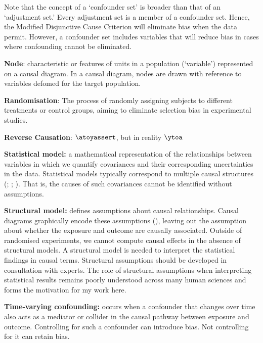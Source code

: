 \documentclass[
  singlecolumn]{article}
\begin{document}
Note that the concept of a `confounder set' is broader than that of an
`adjustment set.' Every adjustment set is a member of a confounder set.
Hence, the Modified Disjunctive Cause Criterion will eliminate bias when
the data permit. However, a confounder set includes variables that will
reduce bias in cases where confounding cannot be eliminated.

\textbf{Node}: characteristic or features of units in a population
(`variable') represented on a causal diagram. In a causal diagram, nodes
are drawn with reference to variables defomed for the target population.

\textbf{Randomisation}: The process of randomly assigning subjects to
different treatments or control groups, aiming to eliminate selection
bias in experimental studies.

\textbf{Reverse Causation}: \(\atoyassert\), but in reality \(\ytoa\)

\textbf{Statistical model:} a mathematical representation of the
relationships between variables in which we quantify covariances and
their corresponding uncertainties in the data. Statistical models
typically correspond to multiple causal structures
(;
;
).
That is, the causes of such covariances cannot be identified without
assumptions.

\textbf{Structural model:} defines assumptions about causal
relationships. Causal diagrams graphically encode these assumptions
(), leaving out the
assumption about whether the exposure and outcome are causally
associated. Outside of randomised experiments, we cannot compute causal
effects in the absence of structural models. A structural model is
needed to interpret the statistical findings in causal terms. Structural
assumptions should be developed in consultation with experts. The role
of structural assumptions when interpreting statistical results remains
poorly understood across many human sciences and forms the motivation
for my work here.

\textbf{Time-varying confounding:} occurs when a confounder that changes
over time also acts as a mediator or collider in the causal pathway
between exposure and outcome. Controlling for such a confounder can
introduce bias. Not controlling for it can retain bias.

\newpage{}
\end{document}

